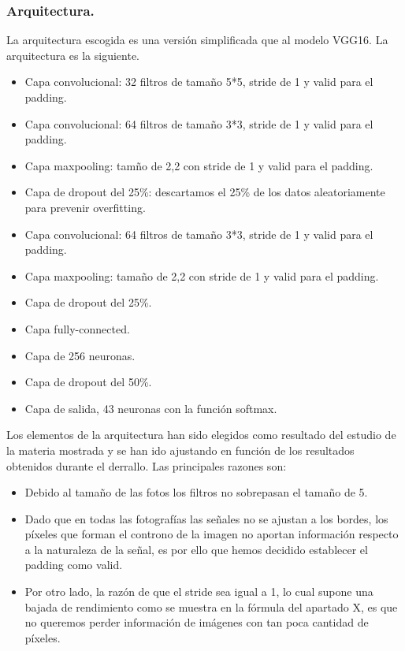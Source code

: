 \documentclass[a4paper,10pt]{article}
\begin{document}
\subsubsection{Arquitectura.}
La arquitectura escogida es una versión simplificada que al modelo VGG16. La arquitectura es la siguiente.
\begin{itemize}
\item Capa convolucional: 32 filtros de tamaño 5*5, stride de 1 y valid para el padding.
\item Capa convolucional: 64 filtros de tamaño 3*3, stride de 1 y valid para el padding.
\item Capa maxpooling: tamño de 2,2 con stride de 1 y valid para el padding.
\item Capa de dropout del 25\%: descartamos el 25\% de los datos aleatoriamente para prevenir overfitting.
\item Capa convolucional: 64 filtros de tamaño 3*3, stride de 1 y valid para el padding.
\item Capa maxpooling: tamaño de 2,2 con stride de 1 y valid para el padding.
\item Capa de dropout del 25\%.
\item Capa fully-connected.
\item Capa de 256 neuronas.
\item Capa de dropout del 50\%.
\item Capa de salida, 43 neuronas con la función softmax.
\end{itemize}
Los elementos de la arquitectura han sido elegidos como resultado del estudio de la materia mostrada y se han ido ajustando en función de los resultados obtenidos durante el derrallo. Las principales razones son:
\begin{itemize}
\item Debido al tamaño de las fotos los filtros no sobrepasan el tamaño de 5. 
\item Dado que en todas las fotografías las señales no se ajustan a los bordes, los píxeles que forman el controno de la imagen no aportan información respecto a la naturaleza de la señal, es por ello que hemos decidido establecer el padding como valid.
\item Por otro lado, la razón de que el stride sea igual a 1, lo cual supone una bajada de rendimiento como se muestra en la fórmula del apartado X, es que no queremos perder información de imágenes con tan poca cantidad de píxeles.
\end{itemize}
\end{document}

